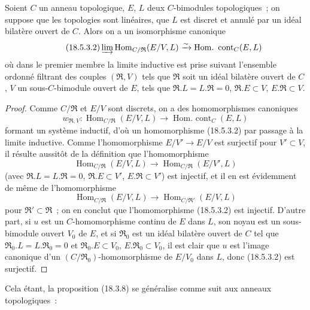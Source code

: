 \begin{lemma}[18.5.3.1]
\label{0.18.5.3.1-fr}
Soient $C$ un anneau topologique, $E$, $L$ deux $C$-bimodules topologiques~;
on suppose que les topologies sont linéaires, que $L$ est discret et annulé
par un idéal bilatère ouvert de $C$. Alors on a un isomorphisme canonique
\begin{equation}
\label{0.18.5.3.2-fr}
\tag{18.5.3.2}
  \varinjlim\operatorname{Hom}_{C/\mathfrak R}(E/V,L)
  \xrightarrow{\sim}\operatorname{Hom.\ cont}_C(E,L)
\end{equation}
où dans le premier membre la limite inductive est prise suivant l'ensemble
ordonné filtrant des couples $(\mathfrak R,V)$ tels que $\mathfrak R$ soit un
idéal bilatère ouvert de $C$, $V$ un sous-$C$-bimodule ouvert de $E$, tels que
$\mathfrak R.L=L.\mathfrak R=0$, $\mathfrak R.E\subset V$,
$E.\mathfrak R\subset V$.
\end{lemma}

\begin{proof}
Comme $C/\mathfrak R$ et $E/V$ sont discrets, on a des homomorphismes
canoniques
\[
  w_{\mathfrak R,V}:\operatorname{Hom}_{C/\mathfrak R}(E/V,L)
  \longrightarrow\operatorname{Hom.\ cont}_C(E,L)
\]
formant un système inductif, d'où un homomorphisme (18.5.3.2) par passage à la
limite inductive. Comme l'homomorphisme $E/V'\to E/V$ est surjectif pour
$V'\subset V$, il résulte aussitôt de la définition que l'homomorphisme
\[
  \operatorname{Hom}_{C/\mathfrak R}(E/V,L)
  \longrightarrow\operatorname{Hom}_{C/\mathfrak R}(E/V',L)
\]
(avec $\mathfrak R.L=L.\mathfrak R=0$, $\mathfrak R.E\subset V'$,
$E.\mathfrak R\subset V'$) est injectif, et il en est évidemment de même de
l'homomorphisme
\[
  \operatorname{Hom}_{C/\mathfrak R}(E/V,L)
  \longrightarrow\operatorname{Hom}_{C/\mathfrak R'}(E/V,L)
\]
pour $\mathfrak R'\subset\mathfrak R$~; on en conclut que l'homomorphisme
(18.5.3.2) est injectif. D'autre part, si $u$ est un $C$-homomorphisme continu
de $E$ dans $L$, son noyau est un sous-bimodule ouvert $V_0$ de $E$, et si
$\mathfrak R_0$ est un idéal bilatère ouvert de $C$ tel que
$\mathfrak R_0.L=L.\mathfrak R_0=0$ et $\mathfrak R_0.E\subset V_0$,
$E.\mathfrak R_0\subset V_0$, il est clair que $u$ est l'image canonique d'un
$(C/\mathfrak R_0)$-homomorphisme de $E/V_0$ dans $L$, donc (18.5.3.2) est
surjectif.
\end{proof}

Cela étant, la proposition (18.3.8) se généralise comme suit aux anneaux
topologiques~:

